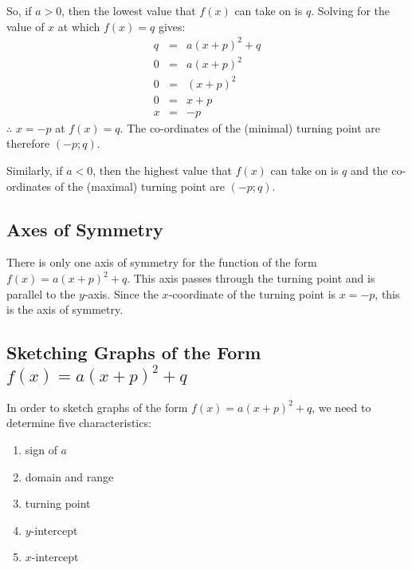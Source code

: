 So, if $a>0$, then the lowest value that $f(x)$ can take on is $q$. Solving for the value of $x$ at which $f(x)=q$ gives:
\begin{eqnarray*}
q&=&a(x+p)^2+q\\
0&=&a(x+p)^2\\
0&=&(x+p)^2\\
0&=&x+p\\
x&=&-p
\end{eqnarray*}
$\therefore$ $x=-p$ at $f(x)=q$. The co-ordinates of the (minimal) turning point are therefore $(-p;q)$.

Similarly, if $a<0$, then the highest value that $f(x)$ can take on is $q$ and the co-ordinates of the (maximal) turning point are $(-p;q)$.


\subsection{Axes of Symmetry}
There is only one axis of symmetry for the function of the form $f(x)=a(x+p)^2+q$. This axis passes through the turning point and is parallel to the $y$-axis. Since the $x$-coordinate of the turning point is $x=-p$, this is the axis of symmetry.


\subsection{Sketching Graphs of the Form $f(x)=a(x+p)^2+q$}
In order to sketch graphs of the form $f(x)=a(x+p)^2+q$, we need to determine five characteristics:
\begin{enumerate}
\item{sign of $a$}
\item{domain and range}
\item{turning point}
\item{$y$-intercept}
\item{$x$-intercept}
\end{enumerate}

